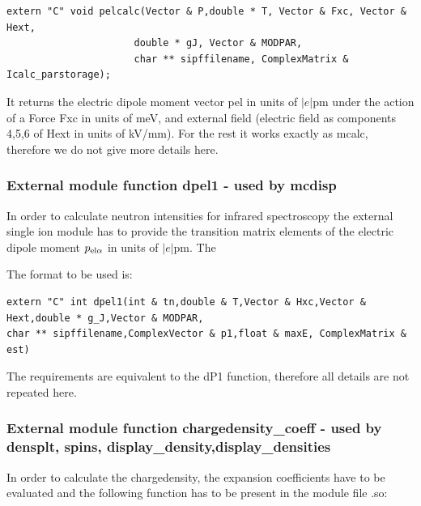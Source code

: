\begin{verbatim}
extern "C" void pelcalc(Vector & P,double * T, Vector & Fxc, Vector & Hext,
                      double * gJ, Vector & MODPAR,
                      char ** sipffilename, ComplexMatrix & Icalc_parstorage);
\end{verbatim}

It returns the electric dipole moment vector {\prg pel}  in units of
$|e|$pm  under the action of a Force {\prg Fxc} in units of meV, and external field
(electric field as components 4,5,6 of Hext in units of kV/mm).
For the rest it works exactly as {\prg mcalc}, therefore we do not give more details here.


\subsubsection{External module function {\prg dpel1} - used by {\prg mcdisp}}

In order to calculate neutron intensities for infrared spectroscopy
the external single ion module has to provide the transition matrix elements of
 the electric dipole moment  $p_{{\rm el} \alpha}$ in units of $|e|$pm. The 

The format to be used is:
{\footnotesize
\begin{verbatim}
extern "C" int dpel1(int & tn,double & T,Vector & Hxc,Vector & Hext,double * g_J,Vector & MODPAR,
char ** sipffilename,ComplexVector & p1,float & maxE, ComplexMatrix & est)
\end{verbatim}
}
The requirements are equivalent to the {\prg dP1} function, therefore all details are not repeated here.

\subsubsection{External module function {\prg chargedensity\_coeff} -
used by {\prg densplt},
{\prg spins},
{\prg display\_density},{\prg display\_densities}}

In order to calculate the chargedensity, the expansion coefficients
have to be evaluated and
 the following function has to be present in the module file {\prg *.so}:

